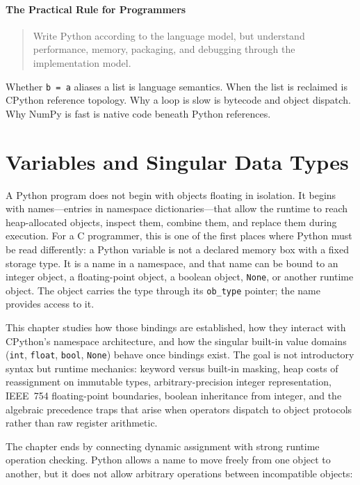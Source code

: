 \documentclass[a4paper,twoside]{report}
\begin{document}
\subsubsection{The Practical Rule for Programmers}

\begin{quote}
Write Python according to the language model, but understand performance, memory, packaging, and debugging through the implementation model.
\end{quote}

Whether \texttt{b = a} aliases a list is language semantics. When the list is reclaimed is CPython reference topology. Why a loop is slow is bytecode and object dispatch. Why NumPy is fast is native code beneath Python references.


\chapter{Variables and Singular Data Types}

A Python program does not begin with objects floating in isolation. It begins with names---entries in namespace dictionaries---that allow the runtime to reach heap-allocated objects, inspect them, combine them, and replace them during execution. For a C programmer, this is one of the first places where Python must be read differently: a Python variable is not a declared memory box with a fixed storage type. It is a name in a namespace, and that name can be bound to an integer object, a floating-point object, a boolean object, \texttt{None}, or another runtime object. The object carries the type through its \texttt{ob\_type} pointer; the name provides access to it.

This chapter studies how those bindings are established, how they interact with CPython's namespace architecture, and how the singular built-in value domains (\texttt{int}, \texttt{float}, \texttt{bool}, \texttt{None}) behave once bindings exist. The goal is not introductory syntax but runtime mechanics: keyword versus built-in masking, heap costs of reassignment on immutable types, arbitrary-precision integer representation, IEEE~754 floating-point boundaries, boolean inheritance from integer, and the algebraic precedence traps that arise when operators dispatch to object protocols rather than raw register arithmetic.

The chapter ends by connecting dynamic assignment with strong runtime operation checking. Python allows a name to move freely from one object to another, but it does not allow arbitrary operations between incompatible objects:
\end{document}
